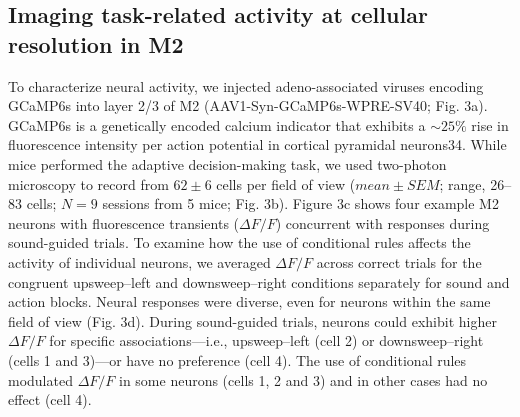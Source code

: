 \subsection{Imaging task-related activity at cellular resolution in M2}
To characterize neural activity, we injected adeno-associated viruses encoding GCaMP6s into layer 2/3 of M2 (AAV1-Syn-GCaMP6s-WPRE-SV40; Fig. 3a). GCaMP6s is a genetically encoded calcium indicator that exhibits a $\sim 25\%$ rise in fluorescence intensity per action potential in cortical pyramidal neurons34. While mice performed the adaptive decision-making task, we used two-photon microscopy to record from $62 \pm 6$ cells per field of view ($mean \pm SEM$; range, 26–83 cells; $N = 9$ sessions from 5 mice; Fig. 3b). Figure 3c shows four example M2 neurons with fluorescence transients ($\Delta F/F$) concurrent with responses during sound-guided trials. To examine how the use of conditional rules affects the activity of individual neurons, we averaged $\Delta F/F$ across correct trials for the congruent upsweep–left and downsweep–right conditions separately for sound and action blocks. Neural responses were diverse, even for neurons within the same field of view (Fig. 3d). During sound-guided trials, neurons could exhibit higher $\Delta F/F$ for specific associations---i.e., upsweep–left (cell 2) or downsweep–right (cells 1 and 3)---or have no preference (cell 4). The use of conditional rules modulated $\Delta F/F$ in some neurons (cells 1, 2 and 3) and in other cases had no effect (cell 4).

